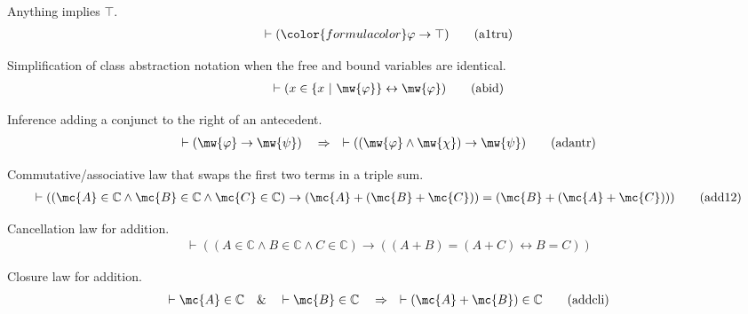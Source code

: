 \begin{lemma} {Anything implies $\top$.}  
\begin{align}
\vdash ( {\color{formulacolor}\varphi} \rightarrow \top )\label{eq:a1tru}\tag{a1tru}
\end{align}
\end{lemma}


\begin{lemma} {Simplification of class abstraction notation}
when the free and bound
     variables are identical. 
\begin{align}
\vdash ( x \in \{ x~\vert~\mw{\varphi} \} \leftrightarrow \mw{\varphi}
    )\label{eq:abid}\tag{abid}
\end{align}
\end{lemma}


\begin{lemma} {Inference adding a conjunct to the right of
an antecedent.}  %
\begin{align}
\vdash ( \mw{\varphi} \rightarrow \mw{\psi} )\quad\Rightarrow\quad \vdash ( (
    \mw{\varphi} \wedge \mw{\chi} ) \rightarrow \mw{\psi}
    )\label{eq:adantr}\tag{adantr}
\end{align}
\end{lemma}


\begin{lemma} {Commutative/associative law that swaps the
first two terms in a triple
     sum.} %
\begin{align}
\vdash ( ( \mc{A} \in \mathbb{C} \wedge \mc{B} \in \mathbb{C} \wedge \mc{C} \in \mathbb{C} )
    \rightarrow ( \mc{A} + ( \mc{B} + \mc{C} ) ) = ( \mc{B} + ( \mc{A} + \mc{C} ) )
    )\label{eq:add12}\tag{add12}
\end{align}
\end{lemma}


\begin{lemma} {Cancellation law for addition.}
\begin{align}
\vdash ( ( A \in \mathbb{C} \wedge B \in \mathbb{C} \wedge C \in \mathbb{C} )
    \rightarrow ( ( A + B ) = ( A + C ) \leftrightarrow B = C )
    )\label{eq:addcan}\tag{addcan}
\end{align}
\end{lemma}


\begin{lemma} {Closure law for addition.}
\begin{align}
\vdash \mc{A} \in \mathbb{C}\quad\&\quad \vdash \mc{B} \in
    \mathbb{C}\quad\Rightarrow\quad \vdash ( \mc{A} + \mc{B} ) \in
    \mathbb{C}\label{eq:addcli}\tag{addcli}
\end{align}
\end{lemma}


